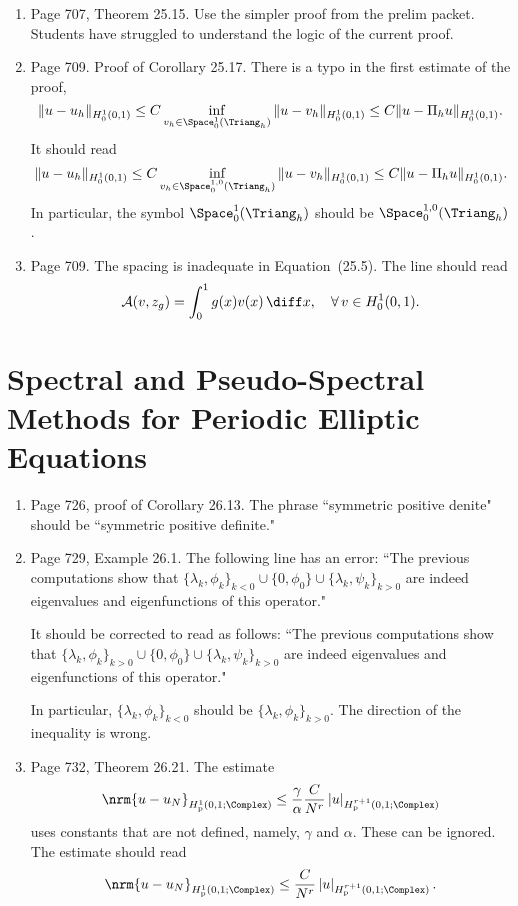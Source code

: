 \documentclass{book}
\begin{document}
\begin{enumerate}
	\item
Page 707, Theorem 25.15. Use the simpler proof from the prelim packet. Students have struggled to understand the logic of the current proof.
	
	\item
Page 709. Proof of Corollary 25.17. There is a typo in the first estimate of the proof, 
	\[
  \| u - u_h \|_{H^1_0(0,1)} \leq C \inf_{v_h \in \Space^1_0(\Triang_h)} \| u - v_h \|_{H^1_0(0,1)} \leq C \| u - \Pi_hu \|_{H^1_0(0,1)} .
\]
It should read
\[
  \| u - u_h \|_{H^1_0(0,1)} \leq C \inf_{v_h \in \Space^{1,0}_0(\Triang_h)} \| u - v_h \|_{H^1_0(0,1)} \leq C \| u - \Pi_hu \|_{H^1_0(0,1)}.
\]
In particular, the symbol $\Space^1_0(\Triang_h)$ should be $\Space^{1,0}_0(\Triang_h)$.	
	
	\item
Page 709. The spacing is inadequate in Equation~(25.5). The line should read
	\[
\mathcal{A}(v,z_g) = \int_0^1 g(x) v(x)\, \diff x, \quad \forall \, v\in H_0^1(0,1).
	\]
	\end{enumerate}
	
\chapter{Spectral and Pseudo-Spectral Methods for Periodic Elliptic Equations}

	\begin{enumerate}
	\item
Page 726, proof of Corollary 26.13. The phrase ``symmetric positive denite" should be ``symmetric positive definite."  

	\item
Page 729, Example 26.1. The following line has an error: ``The previous computations show that $\{\lambda_k,\phi_k\}_{k < 0} \cup \{0,\phi_0\} \cup \{\lambda_k,\psi_k\}_{k>0}$ are indeed eigenvalues and eigenfunctions of this operator."

It should be corrected to read as follows: ``The previous computations show that $\{\lambda_k,\phi_k\}_{k > 0} \cup \{0,\phi_0\} \cup \{\lambda_k,\psi_k\}_{k>0}$ are indeed eigenvalues and eigenfunctions of this operator."

In particular, $\{\lambda_k,\phi_k\}_{k < 0}$ should be $\{\lambda_k,\phi_k\}_{k > 0}$. The direction of the inequality is wrong.

	\item
Page 732, Theorem 26.21. The estimate
\begin{equation*}
  \nrm{u-u_N}_{H^1_{\mathrm{p}}(0,1;\Complex)} \le \frac{\gamma}{\alpha} \frac{C}{N^r} \left| u \right|_{H^{r+1}_{\mathrm{p}}(0,1;\Complex)}
\end{equation*}
uses constants that are not defined, namely, $\gamma$ and $\alpha$. These can be ignored. The estimate should read
\begin{equation*}
  \nrm{u-u_N}_{H^1_{\mathrm{p}}(0,1;\Complex)} \le  \frac{C}{N^r} \left| u \right|_{H^{r+1}_{\mathrm{p}}(0,1;\Complex)}.
\end{equation*}

	\end{enumerate}
	
\end{document}
